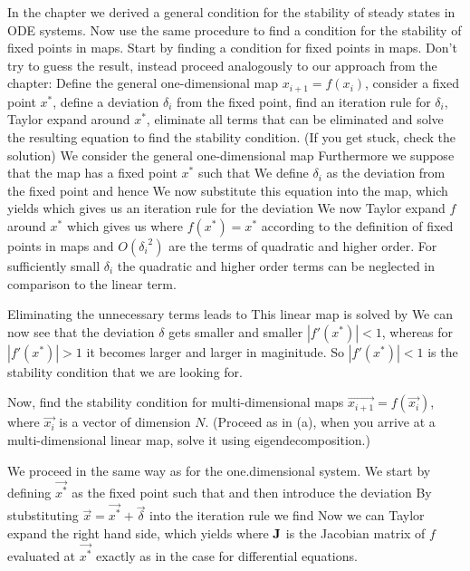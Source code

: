 
In the chapter we derived a general condition for the stability of steady states in ODE systems. Now use the same procedure to find a condition for the stability of fixed points in maps. 
\subquestion Start by finding a condition for fixed points in maps. Don't try to guess the result, instead proceed analogously to our approach from the chapter: Define the general one-dimensional map $x_{i+1}=f(x_i)$, consider a fixed point $x^*$, define a deviation $\delta_i$ from the fixed point, find an iteration rule for $\delta_i$, Taylor expand around $x^*$, eliminate all terms that can be eliminated and solve the resulting equation to find the stability condition. (If you get stuck, check the solution)
\solution  
We consider the general one-dimensional map 
Furthermore we suppose that the map has a fixed point $x^*$ such that 
We define $\delta_i$ as the deviation from the fixed point
and hence 
We now substitute this equation into the map, which yields 
which gives us an iteration rule for the deviation 
We now Taylor expand $f$ around $x^*$ which gives us 
where $f(x^*)=x^*$ according to the definition of fixed points in maps and $O({\delta_i}^2)$ are the terms of quadratic and higher order. For sufficiently small $\delta_i$ the quadratic and higher order terms can be neglected in comparison to the linear term.  

Eliminating the unnecessary terms leads to 
This linear map is solved by  
We can now see that the deviation $\delta$ gets smaller and smaller $|f'(x^*)|<1$, whereas for $|f'(x^*)|>1$ it becomes larger and larger in maginitude. So $|f'(x^*)|<1$ is the stability condition that we are looking for.  

\subquestion
Now, find the stability condition for multi-dimensional maps $\vec{x_{i+1}}=f(\vec{x_i})$, where $\vec{x_i}$ is a vector of dimension $N$. (Proceed as in (a), when you arrive at a multi-dimensional linear map, solve it using eigendecomposition.)

\solution
We proceed in the same way as for the one.dimensional system. We start by defining $\vec{x^*}$ as the fixed point such that 
and then introduce the deviation 
By stubstituting $\vec{x} = \vec{x^*} + \vec{\delta} $ into the iteration rule we find 
Now we can Taylor expand the right hand side, which yields
where $\bf J$ is the Jacobian matrix of $f$ evaluated at $\vec{x^*}$ exactly as in the case for differential equations. 


